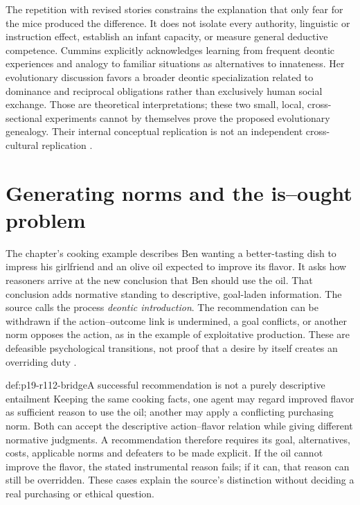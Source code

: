 The repetition with revised stories constrains the explanation that only
fear for the mice produced the difference. It does not isolate every
authority, linguistic or instruction effect, establish an infant capacity,
or measure general deductive competence. Cummins explicitly acknowledges
learning from frequent deontic experiences and analogy to familiar situations
as alternatives to innateness. Her evolutionary discussion favors a broader
deontic specialization related to dominance and reciprocal obligations rather
than exclusively human social exchange. Those are theoretical interpretations;
these two small, local, cross-sectional experiments cannot by themselves prove
the proposed evolutionary genealogy. Their internal conceptual replication
is not an independent cross-cultural replication
\cite[pp.~826--828]{Cummins1996PreschoolDeontic}.

\section{Generating norms and the is--ought problem}
\label{sec:p19-r112-is-ought}

The chapter's cooking example describes Ben wanting a better-tasting dish
to impress his girlfriend and an olive oil expected to improve its flavor.
It asks how reasoners arrive at the new conclusion that Ben should use
the oil. That conclusion adds normative standing to descriptive, goal-laden
information. The source calls the process \emph{deontic introduction}.
The recommendation can be withdrawn if the action--outcome link is undermined,
a goal conflicts, or another norm opposes the action, as in the example
of exploitative production. These are defeasible psychological transitions,
not proof that a desire by itself creates an overriding duty
\cite[p.~654]{Elqayam2021DeonticPsychology}.

\begin{hbexample}{def:p19-r112-bridge}{A successful recommendation is not a purely descriptive entailment}
Keeping the same cooking facts, one agent may regard improved flavor as
sufficient reason to use the oil; another may apply a conflicting purchasing
norm. Both can accept the descriptive action--flavor relation while giving
different normative judgments. A recommendation therefore requires its
goal, alternatives, costs, applicable norms and defeaters to be made explicit.
If the oil cannot improve the flavor, the stated instrumental reason fails;
if it can, that reason can still be overridden. These cases explain the
source's distinction without deciding a real purchasing or ethical question.
\end{hbexample}

